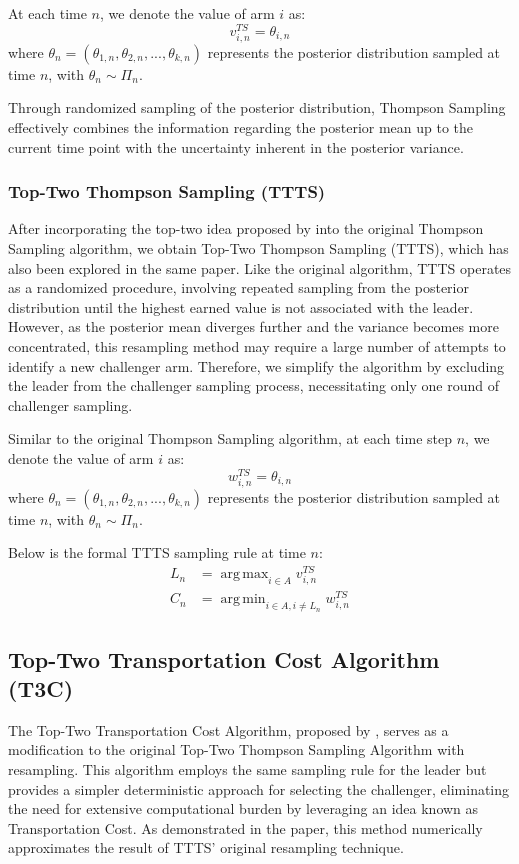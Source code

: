 \documentclass[a4paper, 12pt]{article}
\DeclareMathOperator{\argmax}{arg\,max}
\DeclareMathOperator{\argmin}{arg\,min}
\theoremstyle{definition}
\begin{document}
At each time $n$, we denote the value of arm $i$ as:
\[
v_{i,n}^{TS} = \theta_{i,n}   
\]
where $\theta_n = (\theta_{1,n},\theta_{2,n}, ..., \theta_{k,n})$ represents the posterior distribution sampled at time $n$, with $\theta_{n}\sim \Pi_n$.

Through randomized sampling of the posterior distribution, Thompson Sampling effectively combines the information regarding the posterior mean up to the current time point with the uncertainty inherent in the posterior variance.

\subsubsection{Top-Two Thompson Sampling (TTTS)}
After incorporating the top-two idea proposed by \cite{toptwo} into the original Thompson Sampling algorithm, we obtain Top-Two Thompson Sampling (TTTS), which has also been explored in the same paper. Like the original algorithm, TTTS operates as a randomized procedure, involving repeated sampling from the posterior distribution until the highest earned value is not associated with the leader. However, as the posterior mean diverges further and the variance becomes more concentrated, this resampling method may require a large number of attempts to identify a new challenger arm. Therefore, we simplify the algorithm by excluding the leader from the challenger sampling process, necessitating only one round of challenger sampling.

Similar to the original Thompson Sampling algorithm, at each time step $n$, we denote the value of arm $i$ as:
\[
w_{i,n}^{TS} = \theta_{i,n}   
\]
where $\theta_n = (\theta_{1,n},\theta_{2,n}, ..., \theta_{k,n})$ represents the posterior distribution sampled at time $n$, with $\theta_{n}\sim \Pi_n$.

Below is the formal TTTS sampling rule at time $n$:
\begin{align} \label{eq:ttts}
L_n & = \argmax_{i\in A} v_{i,n}^{TS} \nonumber \\
C_n & = \argmin_{i\in A,i\neq L_n} w_{i,n}^{TS}
\end{align}


\subsection{Top-Two Transportation Cost Algorithm (T3C)}
The Top-Two Transportation Cost Algorithm, proposed by \cite{ttucb2}, serves as a modification to the original Top-Two Thompson Sampling Algorithm with resampling. This algorithm employs the same sampling rule for the leader but provides a simpler deterministic approach for selecting the challenger, eliminating the need for extensive computational burden by leveraging an idea known as Transportation Cost. As demonstrated in the paper, this method numerically approximates the result of TTTS' original resampling technique.
\end{document}
